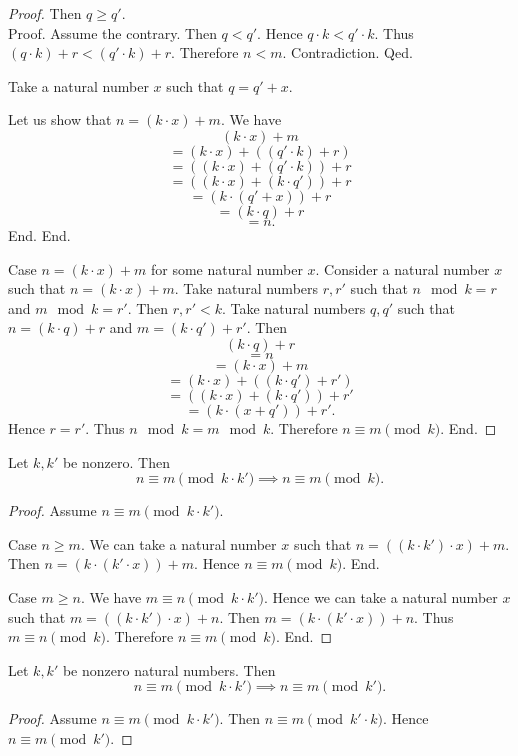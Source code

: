 \documentclass[../../arithmetic.ftl.tex]{subfiles}
\begin{document}
\begin{forthel}
\begin{proof}
        Then $q \geq q'$. \\
        Proof.
          Assume the contrary.
          Then $q < q'$.
          Hence $q \cdot k < q' \cdot k$.
          Thus $(q \cdot k) + r < (q' \cdot k) + r$.
          Therefore $n < m$.
          Contradiction.
        Qed.

        Take a natural number $x$ such that $q = q' + x$.

        Let us show that $n = (k \cdot x) + m$.
          We have
          \[   (k \cdot x) + m \]
          \[ = (k \cdot x) + ((q' \cdot k) + r) \]
          \[ = ((k \cdot x) + (q' \cdot k)) + r \]
          \[ = ((k \cdot x) + (k \cdot q')) + r \]
          \[ = (k \cdot (q' + x)) + r \]
          \[ = (k \cdot q) + r \]
          \[ = n. \]
        End.
      End.

      Case $n = (k \cdot x) + m$ for some natural number $x$.
        Consider a natural number $x$ such that $n = (k \cdot x) + m$.
        Take natural numbers $r,r'$ such that $n \mod k = r$ and $m \mod k = r'$.
        Then $r,r' < k$.
        Take natural numbers $q,q'$ such that $n = (k \cdot q) + r$ and $m = (k \cdot q') + r'$.
        Then
        \[   (k \cdot q) + r \]
        \[ = n \]
        \[ = (k \cdot x) + m \]
        \[ = (k \cdot x) + ((k \cdot q') + r') \]
        \[ = ((k \cdot x) + (k \cdot q')) + r' \]
        \[ = (k \cdot (x + q')) + r'. \]
        Hence $r = r'$.
        Thus $n \mod k = m \mod k$.
        Therefore $n \equiv m \pmod{k}$.
      End.
    \end{proof}

    \begin{proposition}\label{Arithmetic_03_03_665599}
      Let $k,k'$ be nonzero.
      Then \[ n \equiv m \pmod{k \cdot k'} \implies n \equiv m \pmod{k}. \]
    \end{proposition}
    \begin{proof}
      Assume $n \equiv m \pmod{k \cdot k'}$.

      Case $n \geq m$.
        We can take a natural number $x$ such that $n = ((k \cdot k') \cdot x) + m$.
        Then $n = (k \cdot (k' \cdot x)) + m$.
        Hence $n \equiv m \pmod{k}$.
      End.

      Case $m \geq n$.
        We have $m \equiv n \pmod{k \cdot k'}$.
        Hence we can take a natural number $x$ such that $m = ((k \cdot k') \cdot x) + n$.
        Then $m = (k \cdot (k' \cdot x)) + n$.
        Thus $m \equiv n \pmod{k}$.
        Therefore $n \equiv m \pmod{k}$.
      End.
    \end{proof}

    \begin{corollary}\label{Arithmetic_03_03_282418}
      Let $k,k'$ be nonzero natural numbers.
      Then \[ n \equiv m \pmod{k \cdot k'} \implies n \equiv m \pmod{k'}. \]
    \end{corollary}
    \begin{proof}
      Assume $n \equiv m \pmod{k \cdot k'}$.
      Then $n \equiv m \pmod{k' \cdot k}$.
      Hence $n \equiv m \pmod{k'}$.
    \end{proof}
  \end{forthel}
\end{document}
